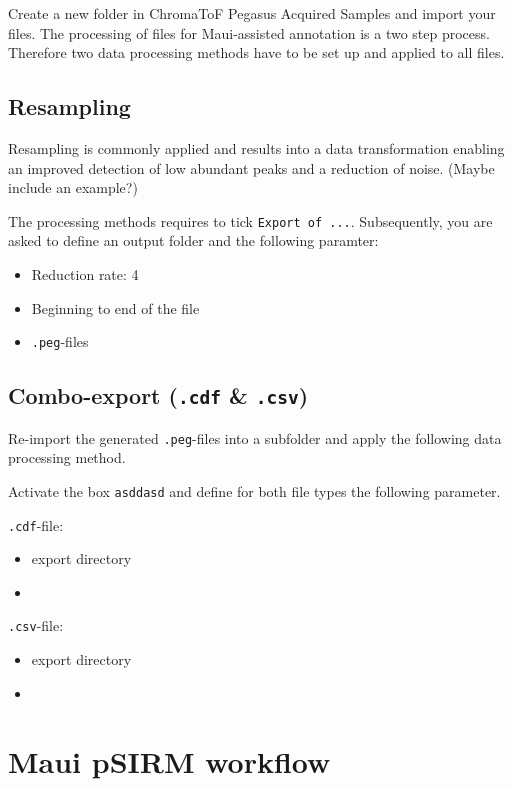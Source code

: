\documentclass[]{book}
\providecommand{\tightlist}{%
  \setlength{\itemsep}{0pt}\setlength{\parskip}{0pt}}
\theoremstyle{definition}
\theoremstyle{definition}
\theoremstyle{definition}
\theoremstyle{remark}
\begin{document}
Create a new folder in ChromaToF Pegasus Acquired Samples and import
your files. The processing of files for Maui-assisted annotation is a
two step process. Therefore two data processing methods have to be set
up and applied to all files.

\subsection{Resampling}\label{resampling}

Resampling is commonly applied and results into a data transformation
enabling an improved detection of low abundant peaks and a reduction of
noise. (Maybe include an example?)

The processing methods requires to tick \texttt{Export\ of\ ...}.
Subsequently, you are asked to define an output folder and the following
paramter:

\begin{itemize}
\tightlist
\item
  Reduction rate: 4
\item
  Beginning to end of the file
\item
  \texttt{.peg}-files
\end{itemize}

\subsection{\texorpdfstring{Combo-export (\texttt{.cdf} \&
\texttt{.csv})}{Combo-export (.cdf \& .csv)}}\label{combo-export-.cdf-.csv}

Re-import the generated \texttt{.peg}-files into a subfolder and apply
the following data processing method.

Activate the box \texttt{asddasd} and define for both file types the
following parameter.

\texttt{.cdf}-file:

\begin{itemize}
\item
  export directory
\item
\end{itemize}

\texttt{.csv}-file:

\begin{itemize}
\item
  export directory
\item
\end{itemize}

\section{Maui pSIRM workflow}\label{mauipsirm}
\end{document}
